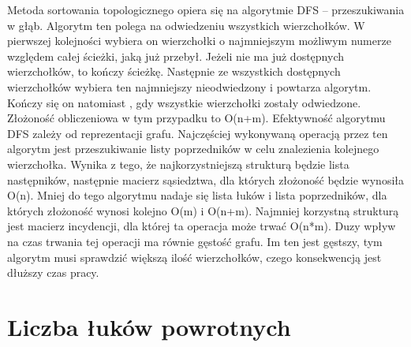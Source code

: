 \documentclass[polish,polish,a4paper]{article}
\begin{document}
Metoda sortowania topologicznego opiera się na algorytmie DFS – przeszukiwania w głąb. Algorytm ten polega na odwiedzeniu wszystkich wierzchołków. W pierwszej kolejności wybiera on wierzchołki o najmniejszym możliwym numerze względem całej ścieżki, jaką już przebył. Jeżeli nie ma już dostępnych wierzchołków, to kończy ścieżkę. Następnie ze wszystkich dostępnych wierzchołków wybiera ten najmniejszy nieodwiedzony i powtarza algorytm. Kończy się on natomiast , gdy wszystkie wierzchołki zostały odwiedzone. Złożoność obliczeniowa w tym przypadku to O(n+m). Efektywność algorytmu DFS zależy od reprezentacji grafu. Najczęściej wykonywaną operacją przez ten algorytm jest przeszukiwanie listy poprzedników w celu znalezienia kolejnego wierzchołka. Wynika z tego, że najkorzystniejszą strukturą będzie lista następników, następnie macierz sąsiedztwa, dla których złożoność będzie wynosiła O(n). Mniej do tego algorytmu nadaje się lista łuków i lista poprzedników, dla których złożoność wynosi kolejno O(m) i O(n+m). Najmniej korzystną strukturą jest macierz incydencji, dla której ta operacja może trwać O(n*m). Duzy wpływ na czas trwania tej operacji ma równie gęstość grafu. Im ten jest gęstszy, tym algorytm musi sprawdzić większą ilość wierzchołków, czego konsekwencją jest dłuższy czas pracy.
	
\section{Liczba łuków powrotnych}
\end{document}
